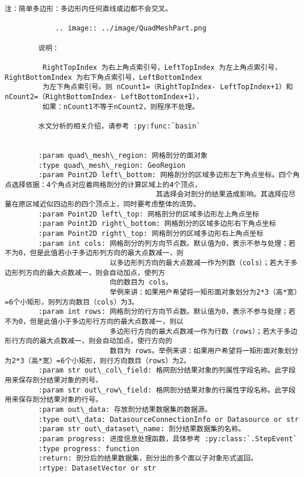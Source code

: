 \documentclass[11pt]{article}
\begin{document}
\begin{Verbatim}[commandchars=\\\{\}]
        注：简单多边形：多边形内任何直线或边都不会交叉。
        
            .. image:: ../image/QuadMeshPart.png
        
        说明：
        
         RightTopIndex 为右上角点索引号，LeftTopIndex 为左上角点索引号，RightBottomIndex 为右下角点索引号，LeftBottomIndex
         为左下角点索引号。则 nCount1=（RightTopIndex- LeftTopIndex+1）和 nCount2=（RightBottomIndex- LeftBottomIndex+1），
         如果：nCount1不等于nCount2，则程序不处理。
        
        水文分析的相关介绍，请参考 :py:func:`basin`
        
        
        :param quad\_mesh\_region: 网格剖分的面对象
        :type quad\_mesh\_region: GeoRegion
        :param Point2D left\_bottom: 网格剖分的区域多边形左下角点坐标。四个角点选择依据：4个角点对应着网格剖分的计算区域上的4个顶点，
                                    其选择会对剖分的结果造成影响。其选择应尽量在原区域近似四边形的四个顶点上，同时要考虑整体的流势。
        :param Point2D left\_top: 网格剖分的区域多边形左上角点坐标
        :param Point2D right\_bottom: 网格剖分的区域多边形右下角点坐标
        :param Point2D right\_top: 网格剖分的区域多边形右上角点坐标
        :param int cols: 网格剖分的列方向节点数。默认值为0，表示不参与处理；若不为0，但是此值若小于多边形列方向的最大点数减一，则
                         以多边形列方向的最大点数减一作为列数（cols）；若大于多边形列方向的最大点数减一，则会自动加点，使列方
                         向的数目为 cols。
                         举例来讲：如果用户希望将一矩形面对象划分为2*3（高*宽）=6个小矩形，则列方向数目（cols）为3。
        :param int rows: 网格剖分的行方向节点数。默认值为0，表示不参与处理；若不为0，但是此值小于多边形行方向的最大点数减一，则以
                         多边形行方向的最大点数减一作为行数（rows）；若大于多边形行方向的最大点数减一，则会自动加点，使行方向的
                         数目为 rows。举例来讲：如果用户希望将一矩形面对象划分为2*3（高*宽）=6个小矩形，则行方向数目（rows）为2。
        :param str out\_col\_field: 格网剖分结果对象的列属性字段名称。此字段用来保存剖分结果对象的列号。
        :param str out\_row\_field: 格网剖分结果对象的行属性字段名称。此字段用来保存剖分结果对象的行号。
        :param out\_data: 存放剖分结果数据集的数据源。
        :type out\_data: DatasourceConnectionInfo or Datasource or str
        :param str out\_dataset\_name: 剖分结果数据集的名称。
        :param progress: 进度信息处理函数，具体参考 :py:class:`.StepEvent`
        :type progress: function
        :return: 剖分后的结果数据集，剖分出的多个面以子对象形式返回。
        :rtype: DatasetVector or str
    

\end{Verbatim}
\end{document}
